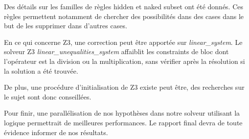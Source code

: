 \documentclass[1]{report}
\begin{document}
    Des détails sur les familles de règles hidden et naked subset ont été donnés. Ces règles permettent notamment de chercher des possibilités dans des cases dans le but de les supprimer dans d'autres cases. \newline
    
    En ce qui concerne Z3, une correction peut être apportée sur \textit{linear\_system}. Le solveur Z3 \textit{linear\_unequalities\_system} affaiblit les constraints de bloc dont l'opérateur est la division ou la multiplication, sans vérifier après la résolution si la solution a été trouvée.
    
    De plus, une procédure d'initialisation de Z3 existe peut être, des recherches sur le sujet sont donc conseillées. \newline
    
    Pour finir, une parallélisation de nos hypothèses dans notre solveur utilisant la logique permettrait de meilleures performances. Le rapport final devra de toute évidence informer de nos résultats. \newline
    
    
\end{document}

